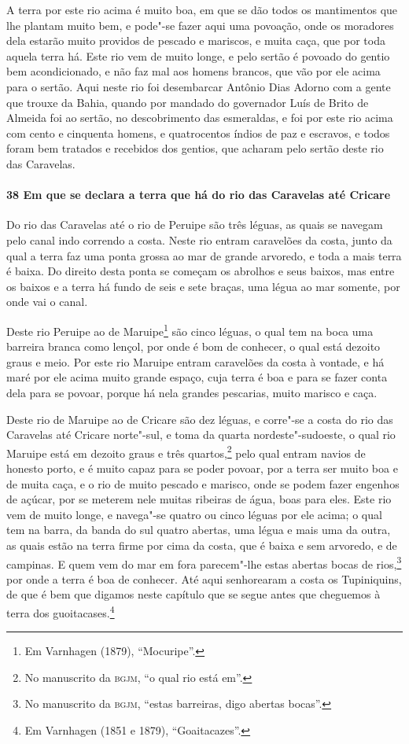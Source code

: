 A terra por este rio acima é muito boa, em que se dão todos os mantimentos que lhe plantam
muito bem, e pode"-se fazer aqui uma povoação, onde os moradores dela estarão muito
providos de pescado e mariscos, e muita caça, que por toda aquela terra há. Este rio vem
de muito longe, e pelo sertão é povoado do gentio bem acondicionado, e não faz mal aos
homens brancos, que vão por ele acima para o sertão. Aqui neste rio foi desembarcar
Antônio Dias Adorno com a gente que trouxe da Bahia, quando por mandado do governador Luís
de Brito de Almeida foi ao sertão, no descobrimento das esmeraldas, e foi por este rio
acima com cento e cinquenta homens, e quatrocentos índios de paz e escravos, e todos foram
bem tratados e recebidos dos gentios, que acharam pelo sertão deste rio das Caravelas.

\paragraph{38 Em que se declara a terra que há do rio das Caravelas até Cricare}

Do rio das Caravelas até o rio de Peruipe são três léguas, as quais se navegam pelo canal
indo correndo a costa. Neste rio entram caravelões da costa, junto da qual a terra faz uma
ponta grossa ao mar de grande arvoredo, e toda a mais terra é baixa. Do direito desta
ponta se começam os abrolhos e seus baixos, mas entre os baixos e a terra há fundo de seis
e sete braças, uma légua ao mar somente, por onde vai o canal.

Deste rio Peruipe ao de Maruipe\footnote{ Em Varnhagen (1879), ``Mocuripe''.} são cinco
léguas, o qual tem na boca uma barreira branca como lençol, por onde é bom de conhecer, o
qual está dezoito graus e meio. Por este rio Maruipe entram caravelões da costa à vontade,
e há maré por ele acima muito grande espaço, cuja terra é boa e para se fazer conta dela
para se povoar, porque há nela grandes pescarias, muito marisco e caça.

Deste rio de Maruipe ao de Cricare são dez léguas, e corre"-se a costa do rio das Caravelas
até Cricare norte"-sul, e toma da quarta nordeste"-sudoeste, o qual rio Maruipe está em
dezoito graus e três quartos,\footnote{ No manuscrito da \textsc{bgjm}, ``o qual rio está
em''.} pelo qual entram navios de honesto porto, e é muito capaz para se poder povoar, por
a terra ser muito boa e de muita caça, e o rio de muito pescado e marisco, onde se podem
fazer engenhos de açúcar, por se meterem nele muitas ribeiras de água, boas para eles.
Este rio vem de muito longe, e navega"-se quatro ou cinco léguas por ele acima; o qual tem
na barra, da banda do sul quatro abertas, uma légua e mais uma da outra, as quais estão na
terra firme por cima da costa, que é baixa e sem arvoredo, e de campinas. E quem vem do
mar em fora parecem"-lhe estas abertas bocas de rios,\footnote{ No manuscrito da
\textsc{bgjm}, ``estas barreiras, digo abertas bocas''.} por onde a terra é boa de
conhecer. Até aqui senhorearam a costa os Tupiniquins, de que é bem que digamos neste
capítulo que se segue antes que cheguemos à terra dos guoitacases.\footnote{ Em Varnhagen
(1851 e 1879), ``Goaitacazes''.}

